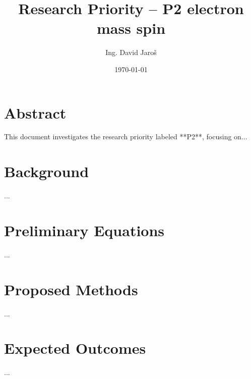 \documentclass[12pt]{article}
\title{Research Priority – P2 electron mass spin}
\author{Ing. David Jaroš}
\date{\today}
\begin{document}
\maketitle

\section*{Abstract}
This document investigates the research priority labeled **P2**, focusing on...

\section*{Background}
...

\section*{Preliminary Equations}
...

\section*{Proposed Methods}
...

\section*{Expected Outcomes}
...
\end{document}
